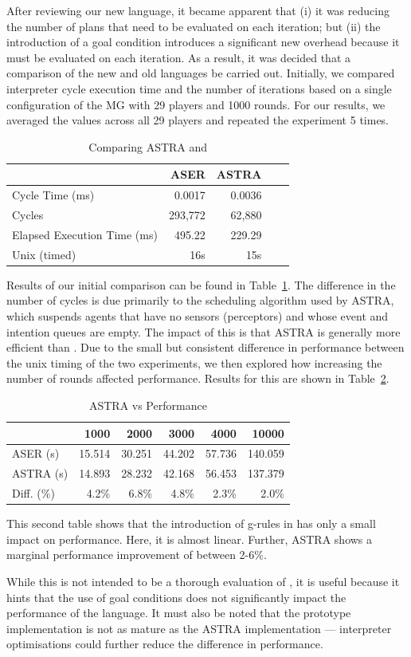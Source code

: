 After reviewing our new language, it became apparent that (i) it was reducing the number of plans 
that need to be evaluated on each iteration; but (ii) the introduction of a goal condition introduces
a significant new overhead because it must be evaluated on each iteration.
As a result, it was decided that a comparison of the new and old languages be carried out. Initially,
we compared interpreter cycle execution time and the number of iterations based on a single 
configuration of the MG with 29 players and 1000 rounds. For our results, we averaged
the values across all 29 players and repeated the experiment 5 times.

\begin{table}[]
\centering
\caption{Comparing ASTRA and {\aser}}
\label{comparison}
\begin{tabular}{lrrrr}
                            & ASER    & ASTRA  \\ \toprule
Cycle Time (ms)             & 0.0017  & 0.0036 \\
Cycles                      & 293,772 & 62,880 \\
Elapsed Execution Time (ms) & 495.22  & 229.29 \\
Unix (timed)                & 16s     & 15s   
\end{tabular}
\end{table}

Results of our initial comparison can be found in Table~\ref{comparison}. The difference
in the number of cycles is due primarily to the scheduling algorithm used by ASTRA, which
suspends agents that have no sensors (perceptors) and whose event and intention queues are empty.
The impact of this is that ASTRA is generally more efficient than {\aser}. Due to the small but 
consistent difference in performance between the unix timing of the two experiments, we then 
explored how increasing the number of rounds affected performance. Results for this are shown 
in Table~\ref{rounds}.

\begin{table}[]
\centering
\caption{ASTRA vs {\aser} Performance}
\label{rounds}
\begin{tabular}{lrrrrr}
           & 1000   & 2000   & 3000   & 4000   & 10000   \\ \toprule
ASER (s)   & 15.514 & 30.251 & 44.202 & 57.736 & 140.059 \\
ASTRA (s)  & 14.893 & 28.232 & 42.168 & 56.453 & 137.379 \\
Diff. (\%) & 4.2\%  & 6.8\%  & 4.8\%  & 2.3\%  & 2.0\%  
\end{tabular}
\end{table}

This second table shows that the introduction of g-rules in {\aser} has only a small impact on 
performance. Here, it is almost linear. Further, ASTRA shows a marginal performance improvement of between 2-6\%.

While this is not intended to be a thorough evaluation of {\aser}, it is useful because
it hints that the use of goal conditions does not significantly impact the performance 
of the language. It must also be noted that the prototype implementation is not as mature 
as the ASTRA implementation --- interpreter optimisations could further reduce the difference 
in performance.

